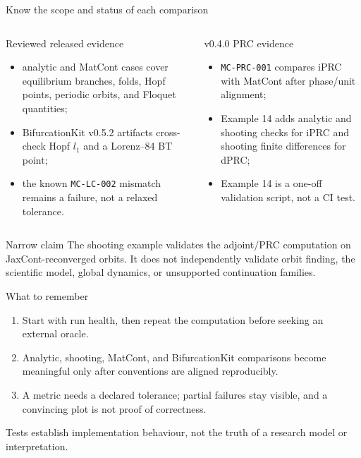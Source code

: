 \begin{frame}{Know the scope and status of each comparison}
\scriptsize
\begin{columns}[T,onlytextwidth]
\releasedbadge
\begin{block}{Reviewed released evidence}
\begin{itemize}
  \item analytic and MatCont cases cover equilibrium branches, folds, Hopf points, periodic orbits, and Floquet quantities;
  \item BifurcationKit v0.5.2 artifacts cross-check Hopf $l_1$ and a Lorenz--84 BT point;
  \item the known \texttt{MC-LC-002} mismatch remains a failure, not a relaxed tolerance.
\end{itemize}
\end{block}
\mainbadge
\begin{block}{v0.4.0 PRC evidence}
\begin{itemize}
  \item \texttt{MC-PRC-001} compares iPRC with MatCont after phase/unit alignment;
  \item Example 14 adds analytic and shooting checks for iPRC and shooting finite differences for dPRC;
  \item Example 14 is a one-off validation script, not a CI test.
\end{itemize}
\end{block}
\end{columns}
\vspace{2mm}
\begin{alertblock}{Narrow claim}
The shooting example validates the adjoint/PRC computation on JaxCont-reconverged orbits. It does not independently validate orbit finding, the scientific model, global dynamics, or unsupported continuation families.
\end{alertblock}
\end{frame}

\begin{frame}{What to remember}
\large
\begin{enumerate}
  \item Start with run health, then repeat the computation before seeking an external oracle.
  \item Analytic, shooting, MatCont, and BifurcationKit comparisons become meaningful only after conventions are aligned reproducibly.
  \item A metric needs a declared tolerance; partial failures stay visible, and a convincing plot is not proof of correctness.
\end{enumerate}
\vfill
\centering
\releasedbadge\qquad\mainbadge

\vspace{2mm}
{\small Tests establish implementation behaviour, not the truth of a research model or interpretation.}
\end{frame}
